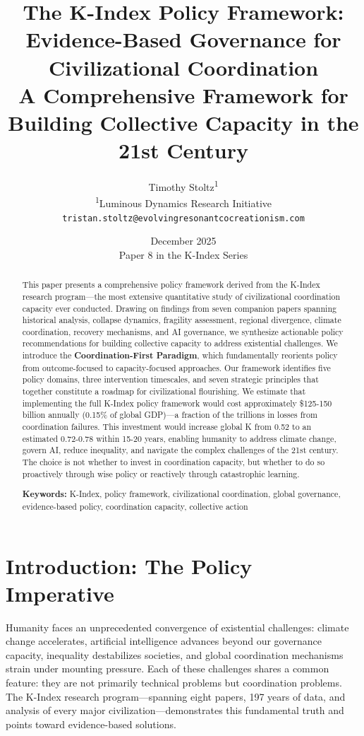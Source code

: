 \documentclass[12pt,letterpaper]{article}
\title{\textbf{The K-Index Policy Framework: Evidence-Based Governance for Civilizational Coordination}\\[0.5cm]
\large A Comprehensive Framework for Building Collective Capacity in the 21st Century}
\author{Timothy Stoltz\textsuperscript{1}\\[0.3cm]
\small \textsuperscript{1}Luminous Dynamics Research Initiative\\
\small \texttt{tristan.stoltz@evolvingresonantcocreationism.com}}
\date{December 2025\\[0.3cm]
\small Paper 8 in the K-Index Series}
\begin{document}
\maketitle

\begin{abstract}
This paper presents a comprehensive policy framework derived from the K-Index research program---the most extensive quantitative study of civilizational coordination capacity ever conducted. Drawing on findings from seven companion papers spanning historical analysis, collapse dynamics, fragility assessment, regional divergence, climate coordination, recovery mechanisms, and AI governance, we synthesize actionable policy recommendations for building collective capacity to address existential challenges. We introduce the \textbf{Coordination-First Paradigm}, which fundamentally reorients policy from outcome-focused to capacity-focused approaches. Our framework identifies five policy domains, three intervention timescales, and seven strategic principles that together constitute a roadmap for civilizational flourishing. We estimate that implementing the full K-Index policy framework would cost approximately \$125-150 billion annually (0.15\% of global GDP)---a fraction of the trillions in losses from coordination failures. This investment would increase global K from 0.52 to an estimated 0.72-0.78 within 15-20 years, enabling humanity to address climate change, govern AI, reduce inequality, and navigate the complex challenges of the 21st century. The choice is not whether to invest in coordination capacity, but whether to do so proactively through wise policy or reactively through catastrophic learning.

\vspace{0.3cm}
\noindent\textbf{Keywords:} K-Index, policy framework, civilizational coordination, global governance, evidence-based policy, coordination capacity, collective action
\end{abstract}

\newpage
\tableofcontents
\newpage

\section{Introduction: The Policy Imperative}

Humanity faces an unprecedented convergence of existential challenges: climate change accelerates, artificial intelligence advances beyond our governance capacity, inequality destabilizes societies, and global coordination mechanisms strain under mounting pressure. Each of these challenges shares a common feature: they are not primarily technical problems but coordination problems. The K-Index research program---spanning eight papers, 197 years of data, and analysis of every major civilization---demonstrates this fundamental truth and points toward evidence-based solutions.
\end{document}
